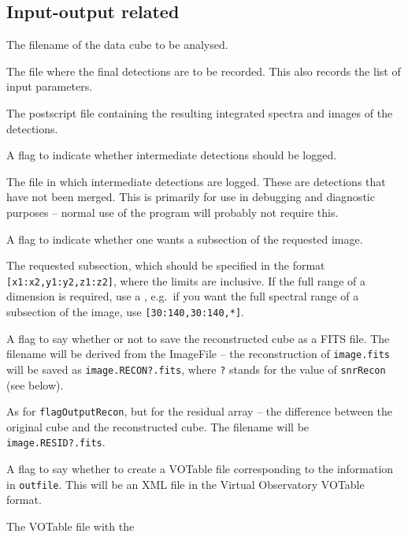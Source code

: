 \documentclass[12pt]{article}
\newcommand{\eg}{e.g.\ }
\newcommand{\entrylabel}[1]{\mbox{\textsf{\bf{#1:}}}\hfil}
\newenvironment{entry}
        {\begin{list}{}%
                {\renewcommand{\makelabel}{\entrylabel}%
                        \setlength{\labelwidth}{30mm}%
                        \setlength{\labelsep}{5pt}%
                        \setlength{\itemsep}{2pt}%
                        \setlength{\parsep}{2pt}%
                        \setlength{\leftmargin}{35mm}%
                }%
        }%
{\end{list}}
\begin{document}
\subsection*{Input-output related}
\begin{entry}
\item[ImageFile (no default assumed)] The filename of the
  data cube to be analysed.
\item[OutFile {\tt [./duchamp-Results]}] The file where the final
  detections are to be recorded. This also records the list of input
  parameters.
\item[SpectraFile {\tt [./duchamp-Spectra.ps]}] The postscript file
  containing the resulting integrated spectra and images of the
  detections. 
\item[flagLog {\tt [true]}] A flag to indicate whether intermediate
  detections should be logged.
\item[LogFile {\tt [./duchamp-Logfile]}] The file in which intermediate
  detections are logged. These are detections that have not been
  merged. This is primarily for use in debugging and diagnostic
  purposes -- normal use of the program will probably not require
  this.
\item[flagSubsection {\tt [false]}] A flag to indicate whether one
  wants a subsection of the requested image.
\item[Subsection {\tt [ [*,*,*] ]}] The requested subsection, which
  should be specified in the format {\tt [x1:x2,y1:y2,z1:z2]}, where
  the limits are inclusive. If the full range of a dimension is
  required, use a {\tt *}, \eg if you want the full spectral range of
  a subsection of the image, use {\tt [30:140,30:140,*]}.
\item[flagOutputRecon {\tt [false]}] A flag to say whether or not to
  save the reconstructed cube as a FITS file. The filename will be
  derived from the ImageFile -- the reconstruction of {\tt image.fits}
  will be saved as {\tt image.RECON?.fits}, where {\tt ?} stands for
  the value of {\tt snrRecon} (see below).
\item[flagOutputResid {\tt [false]}] As for {\tt flagOutputRecon}, but
  for the residual array -- the difference between the original cube
  and the reconstructed cube. The filename will be {\tt
  image.RESID?.fits}.
\item[flagVOT {\tt [false]}] A flag to say whether to create a VOTable
  file corresponding to the information in {\tt outfile}. This will be
  an XML file in the Virtual Observatory VOTable format.
\item[votFile {\tt [./duchamp-Results.xml]}] The VOTable file with the

\end{entry}
\end{document}
